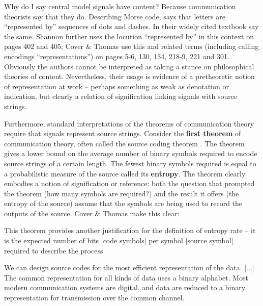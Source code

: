 Why do I say central model signals have content?
Because communication theorists say that they do.
Describing Morse code, \citet[385]{shannon1948mathematicalc} says that letters are ``represented by'' sequences of dots and dashes.
In their widely cited textbook \citet[105]{cover2006elements} say the same.
Shannon further uses the locution ``represented by'' in this context on pages 402 and 405; Cover \& Thomas use this and related terms (including calling encodings ``representations'') on pages 5-6, 130, 134, 218-9, 221 and 301.
Obviously the authors cannot be interpreted as taking a stance on philosophical theories of content.
Nevertheless, their usage is evidence of a pretheoretic notion of representation at work -- perhaps something as weak as denotation or indication, but clearly a relation of signification linking signals with source strings.

Furthermore, standard interpretations of the theorems of communication theory require that signals represent source strings.
Consider the \textbf{first theorem} of communication theory, often called the source coding theorem \citep[$\S$5]{cover2006elements} \citep[$\S$4]{mackay2003information}.
The theorem gives a lower bound on the average number of binary symbols required to encode source strings of a certain length.
The fewest binary symbols required is equal to a probabilistic measure of the source called its \textbf{entropy}.
The theorem clearly embodies a notion of signification or reference: both the question that prompted the theorem (how many symbols are required?) and the result it offers (the entropy of the source) assume that the symbols are being used to record the outputs of the source.
Cover \& Thomas make this clear:

\begin{myquote}
This theorem provides another justification for the definition of entropy rate -- it is the expected number of bits [code symbols] per symbol [source symbol] required to describe the process.
\par\hspace*{\fill}\citet[115]{cover2006elements}
\end{myquote}

\begin{myquote}
We can design source codes for the most efficient representation of the data. [...] The common representation for all kinds of data uses a binary alphabet. Most modern communication systems are digital, and data are reduced to a binary representation for transmission over the common channel.
\par\hspace*{\fill}\citet[218]{cover2006elements}
\end{myquote}


